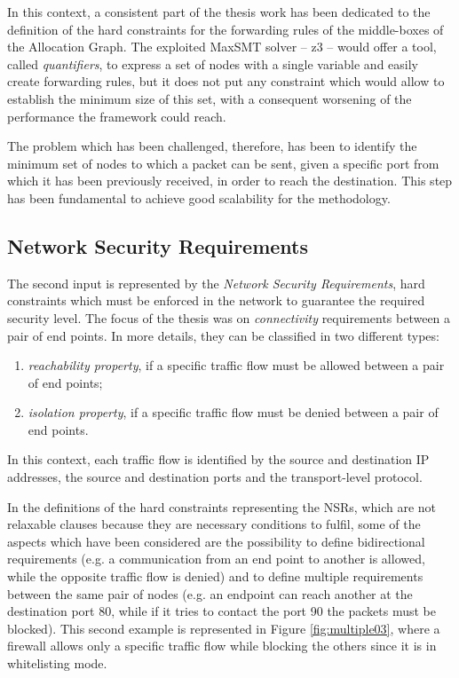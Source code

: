 \documentclass[10pt,a4paper,roman, twocolumn]{article}
\begin{document}
In this context, a consistent part of the thesis work has been dedicated to the definition of the hard constraints for the forwarding rules of the middle-boxes of the Allocation Graph. The exploited MaxSMT solver -- z3 -- would offer a tool, called \textit{quantifiers}, to express a set of nodes with a single variable and easily create forwarding rules, but it does not put any constraint which would allow to establish the minimum size of this set, with a consequent worsening of the performance the framework could reach. 

The problem which has been challenged, therefore, has been to identify the minimum set of nodes to which a packet can be sent, given a specific port from which it has been previously received, in order to reach the destination. This step has been fundamental to achieve good scalability for the methodology.

\subsection{Network Security Requirements}

The second input is represented by the \textit{Network Security Requirements}, hard constraints which must be enforced in the network to guarantee the required security level. The focus of the thesis was on \textit{connectivity} requirements between a pair of end points. In more details, they can be classified in two different types: 
\begin{enumerate}
\setlength\itemsep{-0.3em}
\item \textit{reachability property}, if a specific traffic flow must be allowed between a pair of end points;
\item \textit{isolation property}, if a specific traffic flow must be denied between a pair of end points.
\end{enumerate}
In this context, each traffic flow is identified by the source and destination IP addresses, the source and destination ports and the transport-level protocol.

In the definitions of the hard constraints representing the NSRs, which are not relaxable clauses because they are necessary conditions to fulfil, some of the aspects which have been considered are the possibility to define bidirectional requirements (e.g. a communication from an end point to another is allowed, while the opposite traffic flow is denied) and to define multiple requirements between the same pair of nodes (e.g. an endpoint can reach another at the destination port 80, while if it tries to contact the port 90 the packets must be blocked). This second example is represented in Figure \ref{fig:multiple03}, where a firewall allows only a specific traffic flow while blocking the others since it is in whitelisting mode.
\end{document}
